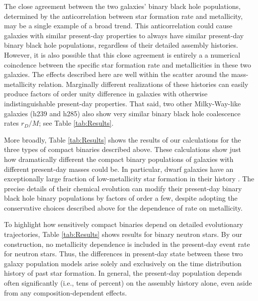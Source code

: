 \documentclass[a4paper,fleqn,usenatbib]{mnras}
\newcommand\editremark[1]{{\color{red}#1}}
\begin{document}
The close agreement between the two galaxies' binary black hole populations, determined by the anticorrelation between
star formation rate and metallicity, may be a single example of a broad trend.  This anticorrelation could cause
galaxies with similar present-day properties to always have similar present-day binary black hole populations,
regardless of their detailed assembly histories.
However, it is also possible that this close agreement is entirely a
a numerical coincdence between the specific star formation rate and metallicities in these two galaxies.  The effects described here
  are well within the scatter around the mass-metallicity relation.  Marginally different realizations of these
  histories can easily produce factors of order unity difference in galaxies with otherwise indistinguishable
  present-day properties.  That said, two other Milky-Way-like  galaxies (h239 and h285) also show very
  similar binary black hole coalescence rates $r_D/M$; see Table \ref{tab:Results}. %

More broadly, Table \ref{tab:Results} shows the results of our calculations for the three types of compact binaries
described above.   These calculations show just how dramatically different the compact binary populations of galaxies
with different present-day masses %
could be.   In particular, dwarf galaxies have an
exceptionally large fraction of low-metallicity star formation in their history \citep{Kirby13}.  The precise details of their chemical
evolution can modify their present-day binary black hole binary populations by factors of order a few, despite  adopting
the conservative choices described above for the dependence of rate on metallicity.  

To highlight how sensitively compact binaries depend on detailed evolutionary trajectories, Table \ref{tab:Results}
shows results for binary neutron stars.  By our construction, no metallicity dependence is included in the present-day
event rate for neutron stars.  Thus, the differences in
present-day state between these two galaxy population models arise solely and exclusively on the time distribution history of past star formation.  In general, the present-day population depends often significantly (i.e., tens of
percent) on the assembly history alone, even aside from any composition-dependent effects.
\end{document}
